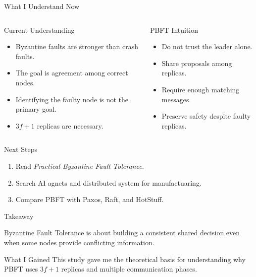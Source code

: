 \documentclass[aspectratio=169]{beamer}
\begin{document}
\begin{frame}{What I Understand Now}
\begin{columns}
\begin{block}{Current Understanding}
\begin{itemize}
  \item Byzantine faults are stronger than crash faults.
  \item The goal is agreement among correct nodes.
  \item Identifying the faulty node is not the primary goal.
  \item \(3f+1\) replicas are necessary.
\end{itemize}
\end{block}

\begin{block}{PBFT Intuition}
\begin{itemize}
  \item Do not trust the leader alone.
  \item Share proposals among replicas.
  \item Require enough matching messages.
  \item Preserve safety despite faulty replicas.
\end{itemize}
\end{block}
\end{columns}
\end{frame}

\begin{frame}{Next Steps}
\begin{enumerate}
  \item Read \textit{Practical Byzantine Fault Tolerance}.
  \item Search AI agnets and distributed system for manufactuaring.
  \item Compare PBFT with Paxos, Raft, and HotStuff.
\end{enumerate}
\end{frame}

\begin{frame}{Takeaway}
\begin{center}
\Large
Byzantine Fault Tolerance is about building a consistent shared decision  
even when some nodes provide conflicting information.
\end{center}

\vspace{0.5cm}

\begin{block}{What I Gained}
This study gave me the theoretical basis for understanding why PBFT uses \(3f+1\) replicas and multiple communication phases.
\end{block}
\end{frame}
\end{document}
